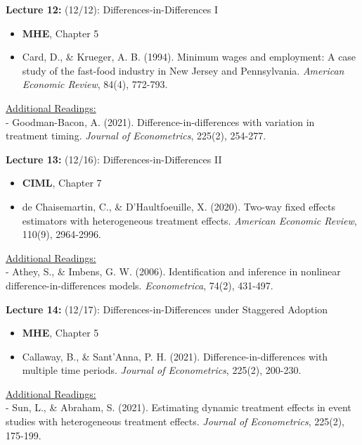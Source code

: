 \documentclass[12pt]{article}
\begin{document}
\vspace{2em}
\noindent\textbf{Lecture 12:} (12/12): Differences-in-Differences I \\
\vspace{1em}
\begin{itemize}
    \item \textbf{MHE}, Chapter 5
    \item Card, D., \& Krueger, A. B. (1994). Minimum wages and employment: A case study of the fast-food industry in New Jersey and Pennsylvania. \textit{American Economic Review}, 84(4), 772-793.
\end{itemize}
\vspace{1em}
\underline{Additional Readings:} \\
\hspace{1em} - Goodman-Bacon, A. (2021). Difference-in-differences with variation in treatment timing. \textit{Journal of Econometrics}, 225(2), 254-277.

\vspace{2em}
\noindent\textbf{Lecture 13:} (12/16): Differences-in-Differences II \\
\vspace{1em}
\begin{itemize}
    \item \textbf{CIML}, Chapter 7
    \item de Chaisemartin, C., \& D’Haultfoeuille, X. (2020). Two-way fixed effects estimators with heterogeneous treatment effects. \textit{American Economic Review}, 110(9), 2964-2996.
\end{itemize}
\vspace{1em}
\underline{Additional Readings:} \\
\hspace{1em} - Athey, S., \& Imbens, G. W. (2006). Identification and inference in nonlinear difference-in-differences models. \textit{Econometrica}, 74(2), 431-497.

\vspace{2em}
\noindent\textbf{Lecture 14:} (12/17): Differences-in-Differences under Staggered Adoption \\
\vspace{1em}
\begin{itemize}
    \item \textbf{MHE}, Chapter 5
    \item Callaway, B., \& Sant’Anna, P. H. (2021). Difference-in-differences with multiple time periods. \textit{Journal of Econometrics}, 225(2), 200-230.
\end{itemize}
\vspace{1em}
\underline{Additional Readings:} \\
\hspace{1em} - Sun, L., \& Abraham, S. (2021). Estimating dynamic treatment effects in event studies with heterogeneous treatment effects. \textit{Journal of Econometrics}, 225(2), 175-199.
\end{document}
